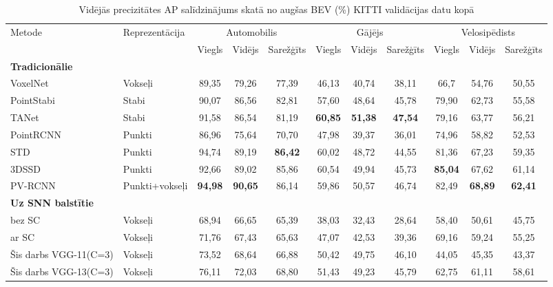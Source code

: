 \begin{table}[t]
\centering
\caption{Vidējās precizitātes AP salīdzinājums skatā no augšas BEV (\%) KITTI validācijas datu kopā}
\label{tab:avg-precision}
\tiny
\begin{adjustbox}{max width=\textwidth}\begin{tabular}{@{}llccccccccc@{}}
\toprule
\multirow{2}{*}{Metode} & \multirow{2}{*}{Reprezentācija} & \multicolumn{3}{c}{Automobilis} & \multicolumn{3}{c}{Gājējs} & \multicolumn{3}{c}{Velosipēdists} \\ \cmidrule(l){3-11} 
                & & Viegls      & Vidējs  & Sarežģīts & Viegls      & Vidējs  & Sarežģīts & Viegls      & Vidējs  & Sarežģīts     \\ \midrule
\textbf{Tradicionālie} &  &  &  &  &  &  &  &  &  &  \\
VoxelNet \cite{zhou2018} & Vokseļi & 89{,}35 & 79{,}26 & 77{,}39 & 46{,}13 & 40{,}74 & 38{,}11 & 66{,}7 & 54{,}76 & 50{,}55 \\
PointStabi \cite{lang2019} & Stabi & 90{,}07 & 86{,}56 & 82{,}81 & 57{,}60 & 48{,}64 & 45{,}78 & 79{,}90 & 62{,}73 & 55{,}58 \\
TANet \cite{liu2020} & Stabi & 91{,}58 & 86{,}54 & 81{,}19 & \textbf{60{,}85} & \textbf{51{,}38} & \textbf{47{,}54} & 79{,}16 & 63{,}77 & 56{,}21 \\
PointRCNN \cite{shi2019} & Punkti & 86{,}96 & 75{,}64 & 70{,}70 & 47{,}98 & 39{,}37 & 36{,}01 & 74{,}96 & 58{,}82 & 52{,}53 \\
STD \cite{yang2019} & Punkti & 94{,}74 & 89{,}19 & \textbf{86{,}42} & 60{,}02 & 48{,}72 & 44{,}55 & 81{,}36 & 67{,}23 & 59{,}35 \\
3DSSD \cite{yang2020} & Punkti & 92{,}66 & 89{,}02 & 85{,}86 & 60{,}54 & 49{,}94 & 45{,}73 & \textbf{85{,}04} & 67{,}62 & 61{,}14 \\
PV-RCNN \cite{shi2020} & Punkti+vokseļi & \textbf{94{,}98} & \textbf{90{,}65} & 86{,}14 & 59{,}86 & 50{,}57 & 46{,}74 & 82{,}49 & \textbf{68{,}89} & \textbf{62{,}41}  \\
\midrule \midrule
\textbf{Uz SNN balstītie} &  &  &  &  &  &  &  &  &  &  \\
\cite{Zhou2020} bez SC & Vokseļi & 68{,}94 & 66{,}65 & 65{,}39 & 38{,}03 & 32{,}43 & 28{,}64 & 58{,}40 & 50{,}61 & 45{,}75 \\
\cite{Zhou2020} ar SC & Vokseļi & 71{,}76 & 67{,}43 & 65{,}63 & 47{,}07 & 42{,}53 & 39{,}36 & 69{,}16 & 59{,}24 & 55{,}25 \\
Šis darbs VGG-11(C=3) & Vokseļi & 73{,}52 & 68{,}64 & 66{,}88 & 50{,}42 & 49{,}75 & 46{,}10 & 44{,}05	& 45{,}35 & 43{,}37\\
Šis darbs VGG-13(C=3) & Vokseļi & 76{,}11 & 72{,}03 & 68{,}80 & 51{,}43 & 49{,}23 & 45{,}79 & 62{,}75 & 61{,}11 & 58{,}61\\
\bottomrule
\end{tabular}\end{adjustbox}
\end{table}

